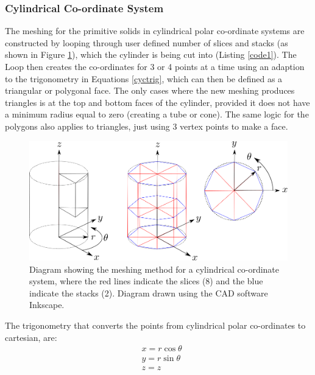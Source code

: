 \documentclass[12pt,a4paper]{article}
\begin{document}
\subsubsection{Cylindrical Co-ordinate System}
\label{cycl}
The meshing for the primitive solids in cylindrical polar co-ordinate systems are constructed by looping through user defined number of slices and stacks (as shown in Figure \ref{cylmeshin}), which the cylinder is being cut into (Listing \ref{code1}). The Loop then creates the co-ordinates for 3 or 4 points at a time using an adaption to the trigonometry in Equations \ref{cyctrig}, which can then be defined as a triangular or polygonal face. The only cases where the new meshing produces triangles is at the top and bottom faces of the cylinder, provided it does not have a minimum radius equal to zero (creating a tube or cone). The same logic for the polygons also applies to triangles, just using 3 vertex points to make a face.

\begin{figure}[h!]
\centering
\includegraphics[scale=0.45]{Images//Coords//cyl.png}
\caption[width=\columnwidth]{Diagram showing the meshing method for a cylindrical co-ordinate system, where the red lines indicate the slices (8) and the blue indicate the stacks (2). Diagram drawn using the CAD software Inkscape.}
\label{cylmeshin}
\end{figure}
\vspace{0.3cm}
The trigonometry that converts the points from cylindrical polar co-ordinates to cartesian, are:
\begin{equation}
\begin{aligned}
\label{cyctrig}
& x = r \cos{\theta} \\
& y = r \sin{\theta} \\
& z = z
\end{aligned}
\end{equation}
\end{document}
